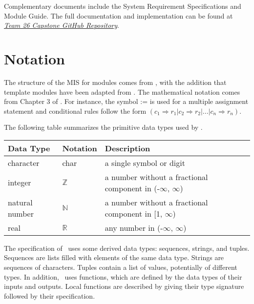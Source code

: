 \documentclass[12pt, titlepage]{article}
\begin{document}
Complementary documents include the System Requirement Specifications
and Module Guide.  The full documentation and implementation can be
found at \href{https://github.com/jordanbierbrier/capstone}{\textit{Team 26 Capstone GitHub Repository}}.

\section{Notation}


The structure of the MIS for modules comes from \citet{HoffmanAndStrooper1995},
with the addition that template modules have been adapted from
\cite{GhezziEtAl2003}.  The mathematical notation comes from Chapter 3 of
\citet{HoffmanAndStrooper1995}.  For instance, the symbol := is used for a
multiple assignment statement and conditional rules follow the form $(c_1
\Rightarrow r_1 | c_2 \Rightarrow r_2 | ... | c_n \Rightarrow r_n )$.

The following table summarizes the primitive data types used by \progname. 

\begin{center}
\renewcommand{\arraystretch}{1.2}
\noindent 
\begin{tabular}{l l p{7.5cm}} 
\toprule 
\textbf{Data Type} & \textbf{Notation} & \textbf{Description}\\ 
\midrule
character & char & a single symbol or digit\\
integer & $\mathbb{Z}$ & a number without a fractional component in (-$\infty$, $\infty$) \\
natural number & $\mathbb{N}$ & a number without a fractional component in [1, $\infty$) \\
real & $\mathbb{R}$ & any number in (-$\infty$, $\infty$)\\
\bottomrule
\end{tabular} 
\end{center}

\noindent
The specification of \progname \ uses some derived data types: sequences, strings, and
tuples. Sequences are lists filled with elements of the same data type. Strings
are sequences of characters. Tuples contain a list of values, potentially of
different types. In addition, \progname \ uses functions, which
are defined by the data types of their inputs and outputs. Local functions are
described by giving their type signature followed by their specification.
\end{document}
